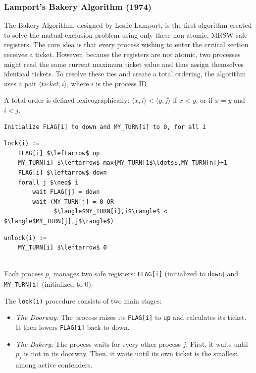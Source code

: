 \subsubsection{Lamport’s Bakery Algorithm (1974)}
The Bakery Algorithm, designed by Leslie Lamport, is the first algorithm created to solve the mutual exclusion problem using only these non-atomic, MRSW safe registers. The core idea is that every process wishing to enter the critical section receives a ticket. However, because the registers are not atomic, two processes might read the same current maximum ticket value and thus assign themselves identical tickets. To resolve these ties and create a total ordering, the algorithm uses a pair $\langle ticket,i\rangle$, where $i$ is the process ID.

A total order is defined lexicographically: $\langle x,i\rangle < \langle y,j\rangle$ if $x<y$, or if $x=y$ and $i<j$.

\begin{minipage}{\textwidth}
\begin{lstlisting}[mathescape]
Initialize FLAG[i] to down and MY_TURN[i] to 0, for all i
\end{lstlisting}
\begin{lstlisting}[mathescape]
lock(i) :=
    FLAG[i] $\leftarrow$ up
    MY_TURN[i] $\leftarrow$ max{MY_TURN[1$\ldots$,MY_TURN[n]}+1
    FLAG[i] $\leftarrow$ down
    forall j $\neq$ i
        wait FLAG[j] = down
        wait (MY_TURN[j] = 0 OR
              $\langle$MY_TURN[i],i$\rangle$ < $\langle$MY_TURN[j],j$\rangle$)
\end{lstlisting}
\begin{lstlisting}[mathescape]
unlock(i) :=
    MY_TURN[i] $\leftarrow$ 0
\end{lstlisting}
\end{minipage}\\

Each process $p_i$ manages two safe registers: \texttt{FLAG[i]} (initialized to \texttt{down}) and \texttt{MY\_TURN[i]} (initialized to 0).

The \texttt{lock(i)} procedure consists of two main stages:
\begin{itemize}
    \item \textit{The Doorway:} The process raises its \texttt{FLAG[i]} to \texttt{up} and calculates its ticket. It then lowers \texttt{FLAG[i]} back to down.
    \item \textit{The Bakery:} The process waits for every other process $j$. First, it waits until $p_j$ is not in its doorway. Then, it waits until its own ticket is the smallest among active contenders.
\end{itemize}

